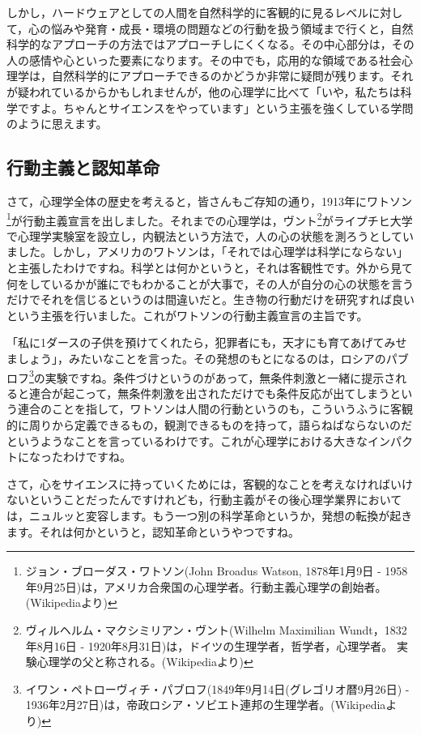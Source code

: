 \documentclass{ltjsbook}
\begin{document}
しかし，ハードウェアとしての人間を自然科学的に客観的に見るレベルに対して，心の悩みや発育・成長・環境の問題などの行動を扱う領域まで行くと，自然科学的なアプローチの方法ではアプローチしにくくなる。その中心部分は，その人の感情や心といった要素になります。その中でも，応用的な領域である社会心理学は，自然科学的にアプローチできるのかどうか非常に疑問が残ります。それが疑われているからかもしれませんが，他の心理学に比べて「いや，私たちは科学ですよ。ちゃんとサイエンスをやっています」という主張を強くしている学問のように思えます。

\subsection{行動主義と認知革命}
さて，心理学全体の歴史を考えると，皆さんもご存知の通り，1913年にワトソン\footnote{ジョン・ブローダス・ワトソン(John Broadus Watson, 1878年1月9日 - 1958年9月25日)は，アメリカ合衆国の心理学者。行動主義心理学の創始者。(Wikipediaより)}が行動主義宣言を出しました。それまでの心理学は，ヴント\footnote{ヴィルヘルム・マクシミリアン・ヴント(Wilhelm Maximilian Wundt，1832年8月16日 - 1920年8月31日)は，ドイツの生理学者，哲学者，心理学者。 実験心理学の父と称される。(Wikipediaより)}がライプチヒ大学で心理学実験室を設立し，内観法という方法で，人の心の状態を測ろうとしていました。しかし，アメリカのワトソンは，「それでは心理学は科学にならない」と主張したわけですね。科学とは何かというと，それは客観性です。外から見て何をしているかが誰にでもわかることが大事で，その人が自分の心の状態を言うだけでそれを信じるというのは間違いだと。生き物の行動だけを研究すれば良いという主張を行いました。これがワトソンの行動主義宣言の主旨です。

「私に1ダースの子供を預けてくれたら，犯罪者にも，天才にも育てあげてみせましょう」，みたいなことを言った。その発想のもとになるのは，ロシアのパブロフ\footnote{イワン・ペトローヴィチ・パブロフ(1849年9月14日(グレゴリオ暦9月26日) - 1936年2月27日)は，帝政ロシア・ソビエト連邦の生理学者。(Wikipediaより)}の実験ですね。条件づけというのがあって，無条件刺激と一緒に提示されると連合が起こって，無条件刺激を出されただけでも条件反応が出てしまうという連合のことを指して，ワトソンは人間の行動というのも，こういうふうに客観的に周りから定義できるもの，観測できるものを持って，語らねばならないのだというようなことを言っているわけです。これが心理学における大きなインパクトになったわけですね。

さて，心をサイエンスに持っていくためには，客観的なことを考えなければいけないということだったんですけれども，行動主義がその後心理学業界においては，ニュルッと変容します。もう一つ別の科学革命というか，発想の転換が起きます。それは何かというと，認知革命というやつですね。
\end{document}
